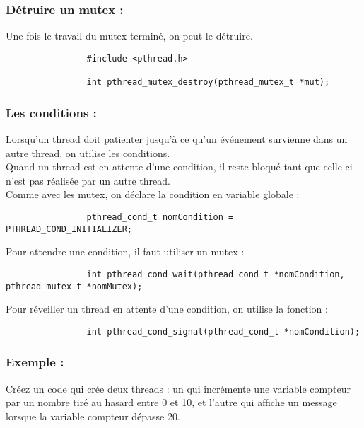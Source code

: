 		\subsubsection*{Détruire un mutex :}
			Une fois le travail du mutex terminé, on peut le détruire.
			\begin{lstlisting}
				#include <pthread.h>

				int pthread_mutex_destroy(pthread_mutex_t *mut);
			\end{lstlisting}
			
		\subsubsection*{Les conditions :}
			Lorsqu'un thread doit patienter jusqu'à ce qu'un événement survienne dans un autre thread, on utilise les conditions.\\
			Quand un thread est en attente d'une condition, il reste bloqué tant que celle-ci n'est pas réalisée par un autre thread.\\
			Comme avec les mutex, on déclare la condition en variable globale :
			\begin{lstlisting}
				pthread_cond_t nomCondition = PTHREAD_COND_INITIALIZER;
			\end{lstlisting}
			Pour attendre une condition, il faut utiliser un mutex :
			\begin{lstlisting}
				int pthread_cond_wait(pthread_cond_t *nomCondition, pthread_mutex_t *nomMutex);
			\end{lstlisting}
			Pour réveiller un thread en attente d'une condition, on utilise la fonction :
			\begin{lstlisting}
				int pthread_cond_signal(pthread_cond_t *nomCondition);
			\end{lstlisting}		
			
		\subsubsection*{Exemple :}
			Créez un code qui crée deux threads : un qui incrémente une variable compteur par un nombre tiré au hasard entre 0 et 10, et l'autre qui affiche un message lorsque la variable compteur dépasse 20.
			
